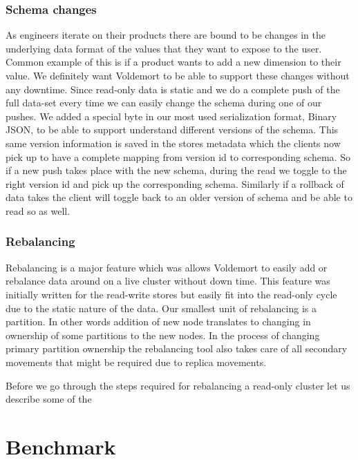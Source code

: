 \documentclass[10pt,twocolumn,preprint,natbib,authoryear]{sigplanconf}
\begin{document}
\subsubsection{Schema changes}
As engineers iterate on their products there are bound to be changes in the underlying data format of the values that they want to expose to the user. Common example of this is if a product wants to add a new dimension to their value. We definitely want Voldemort to be able to support these changes without any downtime. Since read-only data is static and we do a complete push of the full data-set every time we can easily change the schema during one of our pushes. We added a special byte in our most used serialization format, Binary JSON, to be able to support understand different versions of the schema. This same version information is saved in the stores metadata which the clients now pick up to have a complete mapping from version id to corresponding schema. So if a new push takes place with the new schema, during the read we toggle to the right version id and pick up the corresponding schema. Similarly if a rollback of data takes the client will toggle back to an older version of schema and be able to read so as well. 

\subsubsection{Rebalancing}
Rebalancing is a major feature which was allows Voldemort to easily add or rebalance data around on a live cluster without down time. This feature was initially written for the read-write stores but easily fit into the read-only cycle due to the static nature of the data. Our smallest unit of rebalancing is a partition. In other words addition of new node translates to changing in ownership of some partitions to the new nodes. In the process of changing primary partition ownership the rebalancing tool also takes care of all secondary movements that might be required due to replica movements. 

Before we go through the steps required for rebalancing a read-only cluster let us describe some of the 

\section{Benchmark}
\end{document}

